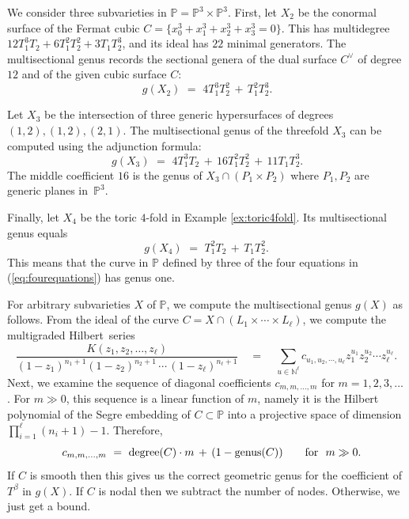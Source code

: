 \documentclass[12pt]{article}
\theoremstyle{definition}
\newenvironment{example}
{\pushQED{\qed}\renewcommand{\qedsymbol}{$\diamond$}\examplex}
{\popQED\endexamplex}
\newcommand{\bN}{\mathbb N}
\newcommand{\bP}{\mathbb P}
\begin{document}
\begin{example}
We consider three subvarieties in $\bP = \bP^3 \times \bP^3$.
First, let $X_2$ be the conormal surface of the Fermat cubic $C =\{x_0^3 + x_1^3 + x_2^3 + x_3^3 = 0\}$.
This has multidegree $12 T_1^3 T_2 + 6 T_1^2 T_2^2 + 3 T_1 T_2^3$, and its ideal has $22$ minimal
generators. The multisectional genus 
 records the sectional genera  of the dual surface $C^\vee$ of degree $12$ and
  of the given cubic surface $C$:
$$\, g(X_2) \,\,= \,\,4 T_1^3 T_2^2 \,+\, T_1^2 T_2^3.$$

Let $X_3$ be the intersection of
three generic hypersurfaces of degrees $(1,2),(1,2),(2,1)$.
The multisectional genus of the threefold $X_3$ can be computed using the adjunction formula:
$$ \, g(X_3) \,\,=\,\, 4 T_1^3 T_2 \,+\,16 T_1^2 T_2^2 \,+\, 11 T_1 T_2^3. $$
The middle coefficient $16$ is the genus of $X_3 \cap (P_1\! \times \! P_2)$ where 
$P_1,P_2$ are generic planes in~$\bP^3$.

Finally, let $X_4$ be the toric $4$-fold in Example \ref{ex:toric4fold}.
Its multisectional genus equals
\begin{equation}
\label{eq:genusoneone}
g(X_4) \,\, = \,\,  T_1^2 T_2 \,+\, T_1 T_2^2. 
\end{equation}
This means that the curve in $\bP$ defined by three of the
four equations in (\ref{eq:fourequations}) has genus one. 
\end{example}

For arbitrary subvarieties $X$ of $\bP$, we compute
the multisectional genus $g(X)$ as follows. 
From the ideal of the curve $C = X \cap (L_1\times \cdots \times L_\ell)$, we compute the multigraded Hilbert~series 
$$ \frac{K(z_1,z_2,\ldots,z_\ell) }{(1-z_1)^{n_1+1} (1-z_2)^{n_2+1} \,\cdots\, (1-z_\ell)^{n_\ell+1}}
\quad = \quad \sum_{u \in \bN^\ell} c_{u_1,u_2,\cdots,u_\ell} z_1^{u_1} z_2^{u_2} \cdots z_\ell^{u_\ell}. $$
Next, we examine the sequence of diagonal coefficients
$c_{m,m,\ldots,m}$ for $m =1,2,3,\ldots$.
For $m \gg 0$, this sequence is a linear function of $m$, namely it is the
Hilbert polynomial of the Segre embedding 
of $C \subset \bP$ into a projective space of
dimension $\prod_{i=1}^\ell (n_i+1) - 1$. Therefore,
\begin{equation}
\label{eq:getgenus} \quad
 c_{m,m,\ldots,m} \,\, = \,\, {\rm degree}(C) \cdot m \,+\, 
(1-{\rm genus}(C)) \qquad {\rm for} \,\,\,\, m \gg 0.
\end{equation}
If $C$ is smooth then this gives us the correct geometric genus for
the coefficient of $T^\beta$ in $g(X)$.
If $C$ is nodal then we subtract the number of nodes.
Otherwise, we just get a bound.
\end{document}
